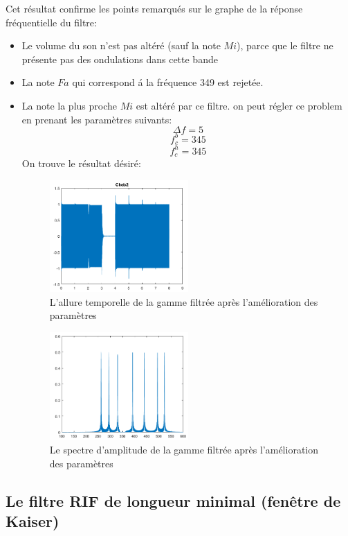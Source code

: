 \documentclass[twoside,twocolumn]{article}
\begin{document}
Cet résultat confirme les points remarqués sur le graphe de la réponse fréquentielle du filtre:
\begin{itemize}
\item
Le volume du son n'est pas altéré (sauf la note $Mi$), parce que le filtre ne présente pas des ondulations dans cette bande
\item La note $Fa$ qui correspond á la fréquence 349 est rejetée.
\item 
La note la plus proche $Mi$ est altéré par ce filtre. on peut régler ce problem en prenant les paramètres suivants:
$$\Delta f = 5$$
$$ f_c^b = 345 $$ 
$$ f_c^h = 345 $$ 
 On trouve le résultat désiré:

\begin{figure}[H]
\centering
\includegraphics[width=0.5\textwidth]{Images/16.png}
\caption{ L'allure temporelle de la gamme filtrée après l'amélioration des paramètres}
\end{figure}

\begin{figure}[H]
\centering
\includegraphics[width=0.5\textwidth]{Images/17.png}
\caption{ Le spectre d'amplitude de la gamme filtrée après l'amélioration des paramètres}
\end{figure}
\end{itemize} 
\newpage
\subsection{Le filtre RIF de longueur minimal (fenêtre de Kaiser)}
\end{document}
